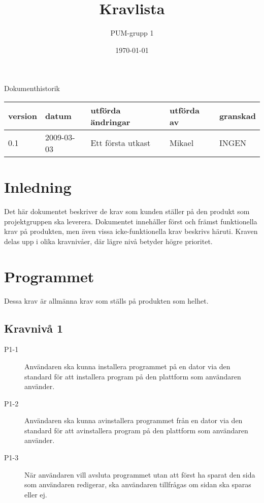 

\ifpdf
\else
\fi

\title{Kravlista}
\author{PUM-grupp 1}
\date{\today}



\maketitle\thispagestyle{empty}

\newpage

{\centering \Large{Dokumenthistorik\\}}

\vspace{10pt}
\begin{tabularx}{\textwidth}{ |l|l|X|l|l| }
  \hline
    \textbf{version} & \textbf{datum} & \textbf{utförda ändringar} & \textbf{utförda av} & \textbf{granskad} \\
	\hline 
  0.1 & 2009-03-03 &  Ett första utkast  & Mikael & INGEN \\
  \hline
\end{tabularx}

\newpage

\setcounter{tocdepth}{2}
\tableofcontents
\newpage

\section{Inledning}
Det här dokumentet beskriver de krav som kunden ställer på den produkt som projektgruppen ska leverera. Dokumentet innehåller först och främst funktionella krav på produkten, men även vissa icke-funktionella krav beskrivs häruti. Kraven delas upp i olika kravnivåer, där lägre nivå betyder högre prioritet.

\section{Programmet}
Dessa krav är allmänna krav som ställs på produkten som helhet.

\subsection{Kravnivå 1}
\begin{description}
\item[P1-1] Användaren ska kunna installera programmet på en dator via den standard för att installera program på den plattform som användaren använder.
\item[P1-2] Användaren ska kunna avinstallera programmet från en dator via den standard för att avinstallera program på den plattform som användaren använder.
\item[P1-3] När användaren vill avsluta programmet utan att först ha sparat den sida som användaren redigerar, ska användaren tillfrågas om sidan ska sparas eller ej.
\end{description}

